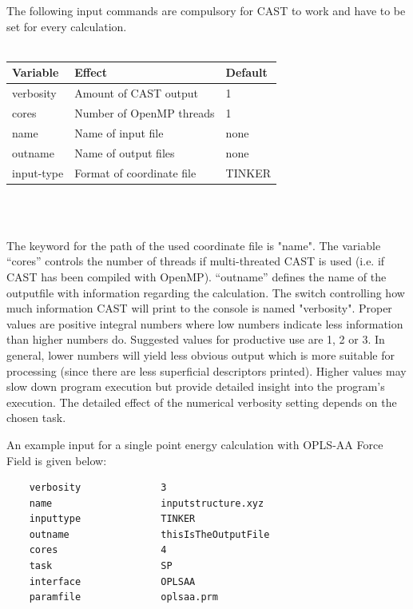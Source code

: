 \documentclass[10pt,a4paper]{article} %
\begin{document}
	The following input commands are compulsory for \ac{CAST} to work and have to be set for every calculation.\\~\\
	\begin{minipage}{\textwidth}
	\begin{tabularx}{\textwidth}{l|l|l}
		Variable&	Effect &	Default \\
		\hline
		verbosity &	Amount of \ac{CAST} output &	1\\
		cores &	Number of OpenMP threads &	1\\
		name &	Name of input file &	none\\
		outname &	Name of output files &	none\\
		input-type &	Format of coordinate file &	TINKER\\
	\end{tabularx}\\~\\
	\end{minipage}
	
	The keyword for the path of the used coordinate file is "name". The variable ``cores'' controls the number of threads if multi-threated \ac{CAST} is used (i.e. if \ac{CAST} has been compiled with OpenMP\supercite{openmp08}). ``outname'' defines the name of the outputfile with information regarding the calculation.
	The switch controlling how much information \ac{CAST} will print to the console is named "verbosity". Proper values are positive integral numbers where low numbers indicate less information than higher numbers do. Suggested values for productive use are 1, 2 or 3. In general, lower numbers will yield less obvious output which is  more suitable for processing (since there are less superficial descriptors printed). Higher values may slow down program execution but provide detailed insight into the program's execution. The detailed effect of the numerical verbosity setting depends on the chosen task.

	An example input for a single point energy calculation with \ac{OPLS-AA} Force Field\supercite{oplsaa, oplsaa2} is given below:
	
	\begin{lstlisting}
	verbosity              3
	name                   inputstructure.xyz
	inputtype              TINKER
	outname                thisIsTheOutputFile
	cores                  4
	task                   SP
	interface              OPLSAA
	paramfile              oplsaa.prm\end{lstlisting}
\end{document}
